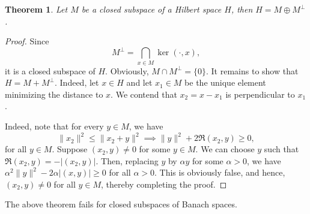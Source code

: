 \documentclass[12pt]{article}
\theoremstyle{thmstyle}
\newtheorem{theorem}{Theorem}[section]
\theoremstyle{defstyle}
\renewcommand{\le}{\leqslant}
\renewcommand{\ge}{\geqslant}
\begin{document}
\begin{theorem}
    Let $M$ be a closed subspace of a Hilbert space $H$, then $H = M\oplus M^\perp$.
\end{theorem}
\begin{proof}
    Since 
    \begin{equation*}
        M^\perp = \bigcap_{x\in M}\ker(\cdot, x),
    \end{equation*}
    it is a closed subspace of $H$. Obviously, $M\cap M^\perp = \{0\}$. It remains to show that $H = M + M^\perp$. Indeed, let $x\in H$ and let $x_1\in M$ be the unique element minimizing the distance to $x$. We contend that $x_2 = x - x_1$ is perpendicular to $x_1$.

    Indeed, note that for every $y\in M$, we have 
    \begin{equation*}
        \|x_2\|^2\le \|x_2 + y\|^2\implies \|y\|^2 + 2\Re(x_2, y)\ge 0,
    \end{equation*}
    for all $y\in M$. Suppose $(x_2, y)\ne 0$ for some $y\in M$. We can choose $y$ such that $\Re(x_2, y) = -|(x_2, y)|$. Then, replacing $y$ by $\alpha y$ for some $\alpha > 0$, we have $\alpha^2\|y\|^2 - 2\alpha|(x, y)|\ge 0$ for all $\alpha > 0$. This is obviously false, and hence, $(x_2, y)\ne 0$ for all $y\in M$, thereby completing the proof.
\end{proof}

The above theorem fails for closed subspaces of Banach spaces.
\end{document}
